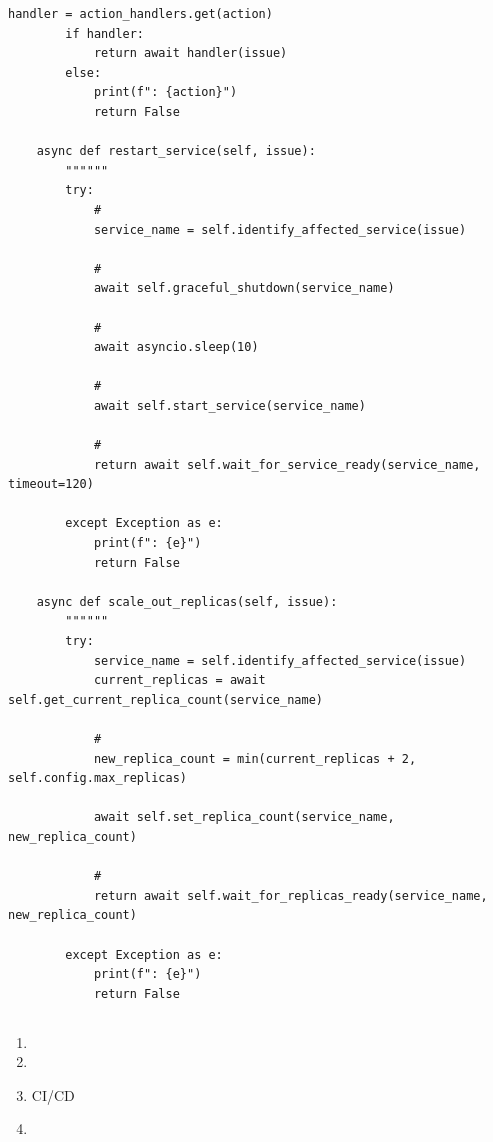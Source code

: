 \begin{lstlisting}[style=python]
        handler = action_handlers.get(action)
        if handler:
            return await handler(issue)
        else:
            print(f": {action}")
            return False
    
    async def restart_service(self, issue):
        """"""
        try:
            # 
            service_name = self.identify_affected_service(issue)
            
            # 
            await self.graceful_shutdown(service_name)
            
            # 
            await asyncio.sleep(10)
            
            # 
            await self.start_service(service_name)
            
            # 
            return await self.wait_for_service_ready(service_name, timeout=120)
            
        except Exception as e:
            print(f": {e}")
            return False
    
    async def scale_out_replicas(self, issue):
        """"""
        try:
            service_name = self.identify_affected_service(issue)
            current_replicas = await self.get_current_replica_count(service_name)
            
            # 
            new_replica_count = min(current_replicas + 2, self.config.max_replicas)
            
            await self.set_replica_count(service_name, new_replica_count)
            
            # 
            return await self.wait_for_replicas_ready(service_name, new_replica_count)
            
        except Exception as e:
            print(f": {e}")
            return False
\end{lstlisting}

\hypertarget{section-129}{%
\subsection{}\label{section-129}}

\important{}

\begin{enumerate}
\def\labelenumi{\arabic{enumi}.}
\item
  \important{}
\item
  \important{}
\item
  \important{}CI/CD
\item
  \important{}
\end{enumerate}

